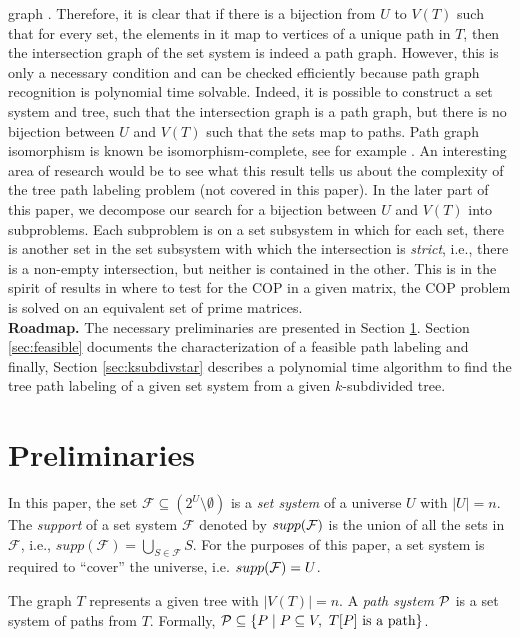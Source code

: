\documentclass[11pt,letter]{../lib/llncs}
\def\cF{{\cal F}}
\def\cP{{\cal P}}
\def\F{{\mathcal F}}
\def\xnoindent{\noindent} %
\def\prelimspace{2mm}
\begin{document}
graph \cite{mcg04}.  Therefore, it is clear that if there is a
bijection from $U$ to $V(T)$ such that for every set, the elements in
it map to vertices of a unique path in $T$, then the intersection
graph of the set system is indeed a path graph.  However, this is only
a necessary condition and can be checked efficiently because path
graph recognition is polynomial time
solvable\cite{gav78,aas93}. Indeed, it is possible to construct a set
system and tree, such that the intersection graph is a path graph, but
there is no bijection between $U$ and $V(T)$ such that the sets map to
paths. Path graph isomorphism is known be isomorphism-complete, see
for example \cite{kklv10}. An interesting area of research would be to
see what this result tells us about the complexity of the tree path
labeling problem (not covered in this paper). In the later part of
this paper, we decompose our search for a bijection between $U$ and
$V(T)$ into subproblems.  Each subproblem is on a set subsystem in
which for each set, there is another set in the set subsystem with
which the intersection is {\em strict}, i.e., there is a non-empty
intersection, but neither is contained in the other.  This is in the
spirit of results in \cite{wlh02,nsnrs09} where to test for the COP in
a given matrix,
the COP problem is solved on an equivalent set of prime matrices.  \\

\noindent
{\bf Roadmap.} The necessary preliminaries are presented in Section
\ref{sec:prelims}. Section \ref{sec:feasible} documents the
characterization of a feasible path labeling and finally,
Section \ref{sec:ksubdivstar} describes a polynomial time
algorithm to find the tree path labeling of a given set system from a
given $k$-subdivided tree.

\section{Preliminaries} \label{sec:prelims} 
In this paper, the set $\F \subseteq (2^{U} \setminus
\emptyset)$ is a {\em set system} of a universe $U$ with $|U| = n$.
The {\em support} of a set system $\F$ denoted by $supp(\cF)$ is the
union of all the sets in $\F$, i.e., $supp(\F) = \bigcup_{S \in
  \F}S$. For the purposes of this paper, a set system is required to
``cover'' the universe, i.e. $ supp(\cF) = U$.

\xnoindent
The graph $T$ represents a given tree with $|V(T)| = n$. 
A {\em path system} $\cP$ is a set system of paths from
$T$. Formally, $\cP \subseteq \{P \mid P \subseteq V, \text{ } T[P]
\text{ is a path} \}$.
\end{document}
